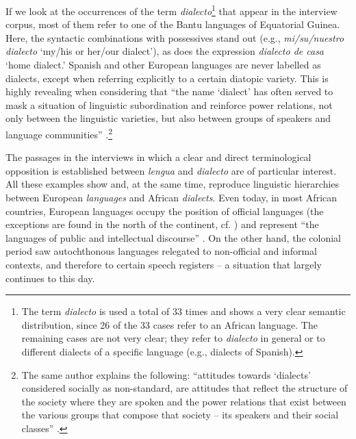 \documentclass[output=paper]{langscibook}
\begin{document}
\largerpage[-1]
If we look at the occurrences of the term \textit{dialecto}\footnote{The term \textit{dialecto} is used a total of 33 times and shows a very clear semantic distribution, since 26 of the 33 cases refer to an African language. The remaining cases are not very clear; they refer to \textit{dialecto} in general or to different dialects of a specific language (e.g., dialects of Spanish).} that appear in the interview corpus, most of them refer to one of the Bantu languages of Equatorial Guinea. Here, the syntactic combinations with possessives stand out (e.g., \textit{mi/su/nuestro dialecto} ‘my/his or her/our dialect’), as does the expression \textit{dialecto de casa} ‘home dialect.’ Spanish and other European languages are never labelled as dialects, except when referring explicitly to a certain diatopic variety. This is highly revealing when considering that “the name ‘dialect’ has often served to mask a situation of linguistic subordination and reinforce power relations, not only between the linguistic varieties, but also between groups of speakers and language communities” \citep[56]{moustaoui_srhir_concept_2016}.\footnote{The same author explains the following: “attitudes towards ‘dialects’ considered socially as non-standard, are attitudes that reflect the structure of the society where they are spoken and the power relations that exist between the various groups that compose that society – its speakers and their social classes” \citep[51]{moustaoui_srhir_concept_2016}.} 

The passages in the interviews in which a clear and direct terminological opposition is established between \textit{lengua} and \textit{dialecto} are of particular interest. All these examples show and, at the same time, reproduce linguistic hierarchies between European \textit{languages} and African \textit{dialects}. Even today, in most African countries, European languages occupy the position of official languages (the exceptions are found in the north of the continent, cf. \citealt[65]{barbosa_da_silva_politica_2011}) and represent “the languages of public and intellectual discourse” \citep[21]{zeleza_inventions_2006}. On the other hand, the colonial period saw autochthonous languages relegated to non-official and informal contexts, and therefore to certain speech registers – a situation that largely continues to this day.
\end{document}
